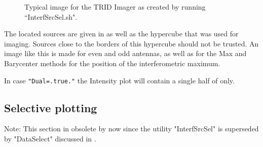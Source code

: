 \begin{figure}[th]
	\caption{Typical image for the TRID Imager as created by running ``InterfSrcSel.sh".}	 
\end{figure}

The located sources are given in  as well as the hypercube that was used for imaging. Sources close to the borders of this hypercube should not be trusted. An image like this is made for even and odd antennas, as well as for the Max and Barycenter methods for the position of the interferometric maximum.

In case \verb!"Dual=.true."! the Intensity plot will contain a single half of  only.

\subsection{Selective plotting}

Note: This section in obsolete by now since the utility "InterfSrcSel" is superseded by "DataSelect" discussed in .

